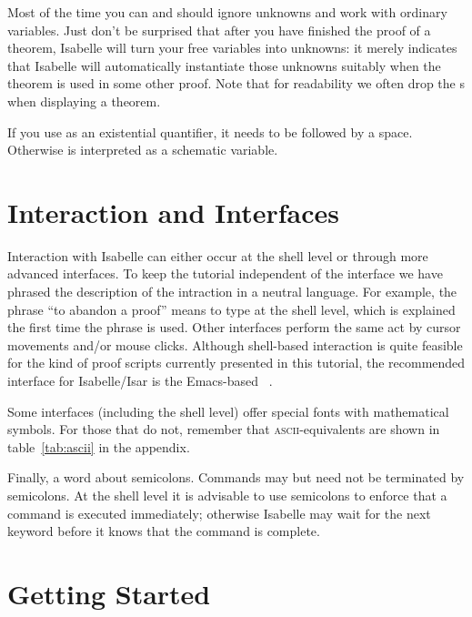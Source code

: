 Most of the time you can and should ignore unknowns and work with ordinary
variables. Just don't be surprised that after you have finished the proof of
a theorem, Isabelle will turn your free variables into unknowns: it merely
indicates that Isabelle will automatically instantiate those unknowns
suitably when the theorem is used in some other proof.
Note that for readability we often drop the s when displaying a theorem.
\begin{warn}
  If you use  as an existential
  quantifier, it needs to be followed by a space. Otherwise  is
  interpreted as a schematic variable.
\end{warn}

\section{Interaction and Interfaces}

Interaction with Isabelle can either occur at the shell level or through more
advanced interfaces. To keep the tutorial independent of the interface we
have phrased the description of the intraction in a neutral language. For
example, the phrase ``to abandon a proof'' means to type  at the
shell level, which is explained the first time the phrase is used. Other
interfaces perform the same act by cursor movements and/or mouse clicks.
Although shell-based interaction is quite feasible for the kind of proof
scripts currently presented in this tutorial, the recommended interface for
Isabelle/Isar is the Emacs-based ~\cite{Aspinall:TACAS:2000,proofgeneral}.

Some interfaces (including the shell level) offer special fonts with
mathematical symbols. For those that do not, remember that \textsc{ascii}-equivalents
are shown in table~\ref{tab:ascii} in the appendix.

Finally, a word about semicolons. 
Commands may but need not be terminated by semicolons.
At the shell level it is advisable to use semicolons to enforce that a command
is executed immediately; otherwise Isabelle may wait for the next keyword
before it knows that the command is complete.


\section{Getting Started}

